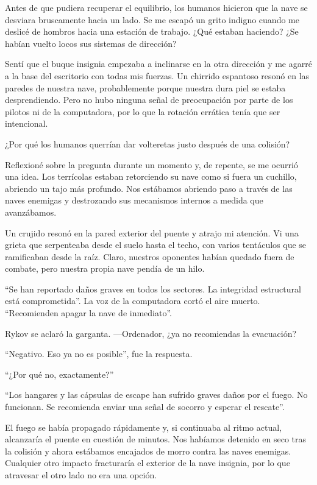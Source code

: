 Antes de que pudiera recuperar el equilibrio, los humanos hicieron que la nave se desviara bruscamente hacia un lado. Se me escapó un grito indigno cuando me deslicé de hombros hacia una estación de trabajo. ¿Qué estaban haciendo? ¿Se habían vuelto locos sus sistemas de dirección?

Sentí que el buque insignia empezaba a inclinarse en la otra dirección y me agarré a la base del escritorio con todas mis fuerzas. Un chirrido espantoso resonó en las paredes de nuestra nave, probablemente porque nuestra dura piel se estaba desprendiendo. Pero no hubo ninguna señal de preocupación por parte de los pilotos ni de la computadora, por lo que la rotación errática tenía que ser intencional.

¿Por qué los humanos querrían dar volteretas justo después de una colisión?

Reflexioné sobre la pregunta durante un momento y, de repente, se me ocurrió una idea. Los terrícolas estaban retorciendo su nave como si fuera un cuchillo, abriendo un tajo más profundo. Nos estábamos abriendo paso a través de las naves enemigas y destrozando sus mecanismos internos a medida que avanzábamos.

Un crujido resonó en la pared exterior del puente y atrajo mi atención. Vi una grieta que serpenteaba desde el suelo hasta el techo, con varios tentáculos que se ramificaban desde la raíz. Claro, nuestros oponentes habían quedado fuera de combate, pero nuestra propia nave pendía de un hilo.

``Se han reportado daños graves en todos los sectores. La integridad estructural está comprometida''. La voz de la computadora cortó el aire muerto. ``Recomienden apagar la nave de inmediato''.

Rykov se aclaró la garganta. —Ordenador, ¿ya no recomiendas la evacuación?

``Negativo. Eso ya no es posible'', fue la respuesta.

``¿Por qué no, exactamente?''

``Los hangares y las cápsulas de escape han sufrido graves daños por el fuego. No funcionan. Se recomienda enviar una señal de socorro y esperar el rescate''.

El fuego se había propagado rápidamente y, si continuaba al ritmo actual, alcanzaría el puente en cuestión de minutos. Nos habíamos detenido en seco tras la colisión y ahora estábamos encajados de morro contra las naves enemigas. Cualquier otro impacto fracturaría el exterior de la nave insignia, por lo que atravesar el otro lado no era una opción.

